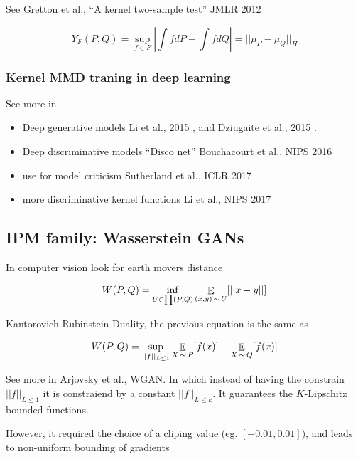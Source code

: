 \documentclass[b5paper]{report}
\begin{document}
See Gretton et al., ``A kernel two-sample test'' JMLR 2012
\cite{gretton2012kernel}


\begin{equation}
  Y_F(P,Q) = \sup_{f \in F} \left| \int fdP - \int fdQ \right| = || \mu_P -
  \mu_Q ||_H
\end{equation}

\subsubsection{Kernel MMD traning in deep learning}

See more in

\begin{itemize}
  \item Deep generative models Li et al., 2015 \cite{li2015generative}, and
    Dziugaite et al., 2015 \cite{dziugaite2015training}.
  \item Deep discriminative models ``Disco net'' Bouchacourt et al., NIPS 2016
    \cite{bouchacourt2016disco}
  \item use for model criticism Sutherland et al., ICLR 2017 \cite{sutherland2017soumyajit}
  \item more discriminative kernel functions Li et al., NIPS 2017
    \cite{li2017mmd}
\end{itemize}


\subsection{IPM family: Wasserstein GANs}

In computer vision look for earth movers distance

\begin{equation}
  W(P,Q) = \inf_{U\in \prod (P,Q)} \operatorname*{\mathbb{\mathop{E}}}_{(x,y) \operatorname*{\sim} U} [||x-y||]
\end{equation}

Kantorovich-Rubinstein Duality, the previous equation is the same as

\begin{equation}
W(P,Q) = \sup_{||f||_{L \le 1}} \operatorname*{\mathbb{\mathop{E}}}_{X \operatorname*{\sim} P}[f(x)] -
\operatorname*{\mathbb{\mathop{E}}}_{X\operatorname*{\sim} Q} [f(x)]
\end{equation}

See more in Arjovsky et al., WGAN. In which instead of having the constrain
$||f||_{L \le 1}$ it is constraiend by a constant $||f||_{L \le k}$. It guarantees the
$K$-Lipschitz bounded functions.

However, it required the choice of a cliping value (eg. $[-0.01, 0.01]$), and
leads to non-uniform bounding of gradients
\end{document}
